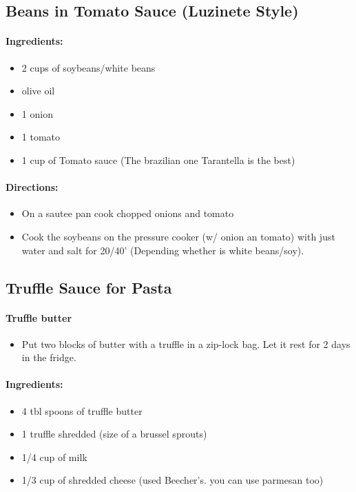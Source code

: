 \documentclass{article}
\begin{document}
\subsection{Beans in Tomato Sauce (Luzinete Style)}

\paragraph{Ingredients:}

\begin{itemize}
	\item 2 cups of soybeans/white beans
	\item olive oil
	\item 1 onion
	\item 1 tomato
	\item 1 cup of Tomato sauce (The brazilian one Tarantella is the best)
\end{itemize}

\paragraph{Directions:}
\begin{itemize}
	\item On a sautee pan cook chopped onions and tomato
	\item Cook the soybeans on the pressure cooker (w/ onion an tomato) with just water and salt for 20/40' (Depending whether is white beans/soy).
\end{itemize}

\subsection{Truffle Sauce for Pasta}

\paragraph{Truffle butter}
\begin{itemize}
	\item Put two blocks of butter with a truffle in a zip-lock bag. Let it rest for 2 days in the fridge.
\end{itemize}

\paragraph{Ingredients:}

\begin{itemize}
	\item 4 tbl spoons of truffle butter
	\item 1 truffle shredded (size of a brussel sprouts)
	\item 1/4 cup of milk
	\item 1/3 cup of shredded cheese (used Beecher's. you can use parmesan too)
\end{itemize}
\end{document}

